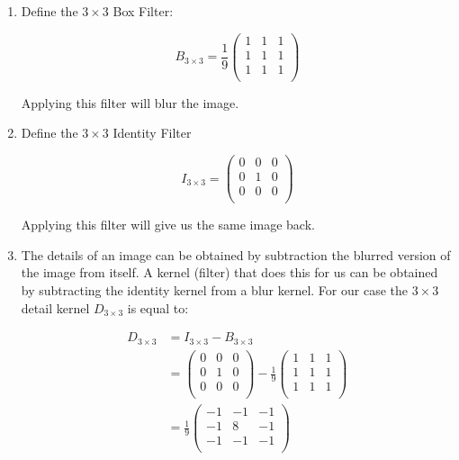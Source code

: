 \documentclass{paper}
\begin{document}
\begin{enumerate}
\item Define the
$3 \times 3$ Box Filter:
 
\begin{equation}
B_{3 \times 3} = 
\frac{1}{9}
\begin{pmatrix}
1 & 1 & 1 \\
1 & 1 & 1 \\
1 & 1 & 1 \\
\end{pmatrix}
\label{eq:box_filter_3x3_2}
\end{equation}

Applying this filter will blur the image.

\item Define the $3 \times 3$ Identity Filter 

\begin{equation}
I_{3 \times 3} = 
\begin{pmatrix}
0 & 0 & 0 \\
0 & 1 & 0 \\
0 & 0 & 0 \\
\end{pmatrix}
\label{eq:id_filter}
\end{equation}

Applying this filter will give us the same image back.

\item The details of an image can be obtained by subtraction the blurred version of the image from itself. A kernel (filter) that does this for us can be obtained by subtracting the identity kernel from a blur kernel. For our case the  $3 \times 3$ detail kernel $D_{3 \times 3}$ is equal to:

\begin{align}
     D_{3 \times 3} 
     &= I_{3 \times 3} - B_{3 \times 3} \\
     &= 
\begin{pmatrix}
0 & 0 & 0 \\
0 & 1 & 0 \\
0 & 0 & 0 \\
\end{pmatrix} 
-\frac{1}{9}
\begin{pmatrix}
1 & 1 & 1 \\
1 & 1 & 1 \\
1 & 1 & 1 \\
\end{pmatrix} \\
&= 
\frac{1}{9}
\begin{pmatrix}
-1 & -1 & -1 \\
-1 & 8 & -1 \\
-1 & -1 & -1 \\
\end{pmatrix}
\label{eq:detail_boost}
\end{align}



\end{enumerate}
\end{document}
